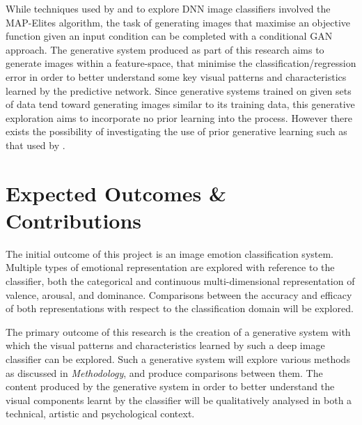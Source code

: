 \documentclass{article}
\begin{document}
While techniques used by \citet{nguyen2015deep} and \citet{nguyen2015innovation} to explore DNN image classifiers involved the MAP-Elites algorithm, the task of generating images that maximise an objective function given an input condition can be completed with a conditional GAN approach.
The generative system produced as part of this research aims to generate images within a feature-space, that minimise the classification/regression error in order to better understand some key visual patterns and characteristics learned by the predictive network.
Since generative systems trained on given sets of data tend toward generating images similar to its training data, this generative exploration aims to incorporate no prior learning into the process.
However there exists the possibility of investigating the use of prior generative learning such as that used by \citet{nguyen2016synthesizing}.

\section{Expected Outcomes \& Contributions}

The initial outcome of this project is an image emotion classification system.
Multiple types of emotional representation are explored with reference to the classifier, both the categorical and continuous multi-dimensional representation of valence, arousal, and dominance.
Comparisons between the accuracy and efficacy of both representations with respect to the classification domain will be explored.

The primary outcome of this research is the creation of a generative system with which the visual patterns and characteristics learned by such a deep image classifier can be explored.
Such a generative system will explore various methods as discussed in \textit{Methodology}, and produce comparisons between them.
The content produced by the generative system in order to better understand the visual components learnt by the classifier will be qualitatively analysed in both a technical, artistic and psychological context.



\end{document}
